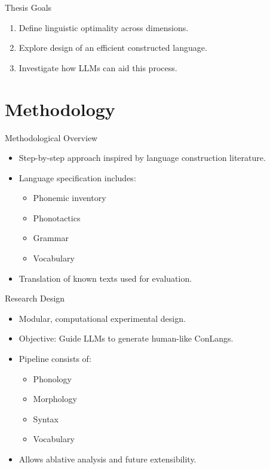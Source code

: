 \documentclass{beamer}
\begin{document}
\begin{frame}{Thesis Goals}
	\begin{enumerate}
		\item Define linguistic optimality across dimensions.
		\item Explore design of an efficient constructed language.
		\item Investigate how LLMs can aid this process.
	\end{enumerate}
\end{frame}

\section{Methodology}

\begin{frame}{Methodological Overview}
	\begin{itemize}
		\item Step-by-step approach inspired by language construction literature.
		\item Language specification includes:
		\begin{itemize}
			\item Phonemic inventory
			\item Phonotactics
			\item Grammar
			\item Vocabulary
		\end{itemize}
		\item Translation of known texts used for evaluation.
	\end{itemize}
\end{frame}

\begin{frame}{Research Design}
	\begin{itemize}
		\item Modular, computational experimental design.
		\item Objective: Guide LLMs to generate human-like ConLangs.
		\item Pipeline consists of:
		\begin{itemize}
			\item Phonology
			\item Morphology
			\item Syntax
			\item Vocabulary
		\end{itemize}
		\item Allows ablative analysis and future extensibility.
	\end{itemize}
\end{frame}
\end{document}
